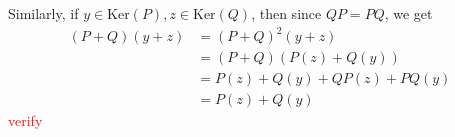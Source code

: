 \documentclass[12pt]{exam}
\theoremstyle{plain} %
\theoremstyle{definition} %
\theoremstyle{remark} %
\begin{document}
\begin{questions}
\begin{solution}
\begin{parts}
      Similarly, if $y \in \textrm{Ker}(P), z \in \textrm{Ker}(Q)$,
      then since $QP = PQ$, we get
      \begin{align*}
        (P+Q)(y + z) &= (P+Q)^2(y + z) \\
        &= (P+Q)(P(z) + Q(y)) \\
        &= P(z) + Q(y) + QP(z) + PQ(y) \\
        &= P(z) + Q(y)
      \end{align*}
      \textcolor{red}{verify}
    \end{parts}
  \end{solution}

\end{questions}
\printbibliography[heading=bibintoc]
\end{document}

